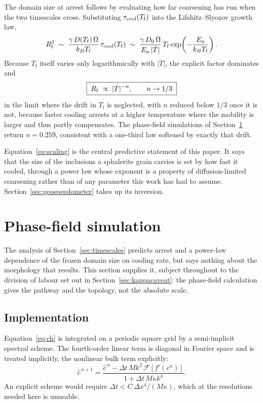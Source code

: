 \documentclass[preprint,12pt,authoryear]{elsarticle}
\newcommand{\Tf}{T_{\mathrm{f}}}
\begin{document}
The domain size at arrest follows by evaluating how far coarsening has run when
the two timescales cross. Substituting $\tau_{\rm cool}(\Tf)$ into the
Lifshitz--Slyozov growth law,
\begin{equation}
R_{\rm f}^3 \;\sim\; \frac{\gamma\, D(\Tf)\, \Omega}{k_B \Tf}\,
                     \tau_{\rm cool}(\Tf)
             \;\sim\; \frac{\gamma\, D_0\, \Omega}{E_a\, \lvert\dot{T}\rvert}
                      \, \Tf \exp\!\left(-\frac{E_a}{k_B \Tf}\right).
\label{eq:Rf}
\end{equation}
Because $\Tf$ itself varies only logarithmically with $\lvert\dot{T}\rvert$, the
explicit factor dominates and
\begin{equation}
\boxed{\;R_{\rm f} \;\propto\; \lvert\dot{T}\rvert^{-n}, \qquad n \to 1/3 \;}
\label{eq:scaling}
\end{equation}
in the limit where the drift in $\Tf$ is neglected, with $n$ reduced below
$1/3$ once it is not, because faster cooling arrests at a higher temperature
where the mobility is larger and thus partly compensates. The phase-field
simulations of Section~\ref{sec:pf} return $n = 0.259$, consistent with a
one-third law softened by exactly that drift.

Equation~\eqref{eq:scaling} is the central predictive statement of this paper.
It says that the size of the inclusions a sphalerite grain carries is set by how
fast it cooled, through a power law whose exponent is a property of
diffusion-limited coarsening rather than of any parameter this work has had to
assume. Section~\ref{sec:geospeedometer} takes up its inversion.

\section{Phase-field simulation}
\label{sec:pf}

The analysis of Section~\ref{sec:timescales} predicts arrest and a power-law
dependence of the frozen domain size on cooling rate, but says nothing about the
morphology that results. This section supplies it, subject throughout to the
division of labour set out in Section~\ref{sec:kappacaveat}: the phase-field
calculation gives the pathway and the topology, not the absolute scale.

\subsection{Implementation}

Equation~\eqref{eq:ch} is integrated on a periodic square grid by a
semi-implicit spectral scheme. The fourth-order linear term is diagonal in
Fourier space and is treated implicitly, the nonlinear bulk term explicitly:
\begin{equation}
\hat{c}^{\,n+1} = \frac{\hat{c}^{\,n} - \Delta t\, M k^2\,
                        \mathcal{F}\!\left[f'(c^n)\right]}
                       {1 + \Delta t\, M \kappa k^4}.
\label{eq:scheme}
\end{equation}
An explicit scheme would require $\Delta t < C\,\Delta x^4/(M\kappa)$, which at
the resolutions needed here is unusable.
\end{document}
